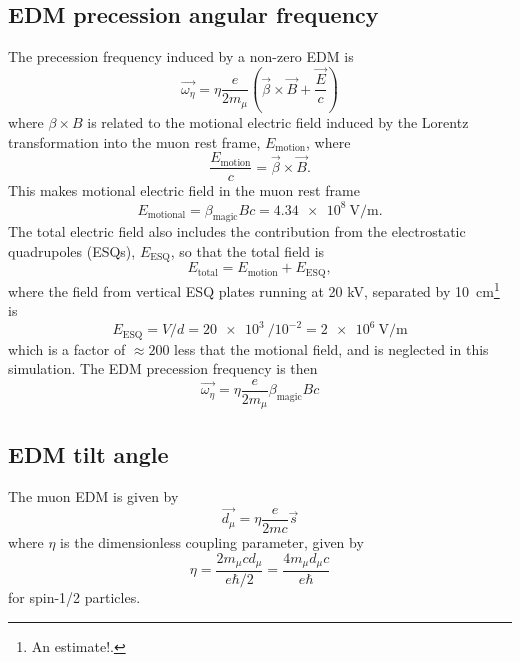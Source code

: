 \documentclass[11pt]{article}
\begin{document}
\subsection{EDM precession angular frequency}
%
The precession frequency induced by a non-zero EDM is 
%
\begin{equation}
\vec{\omega_\eta} = \eta \frac{e}{2 m_\mu}(\vec{\beta} \times \vec{B} + \frac{\vec{E}}{c})
\end{equation}
%
where $\beta \times B$ is related to the motional electric field induced by the Lorentz transformation into the muon rest frame, $E_{\text{motion}}$, where
%
\begin{equation}
\frac{E_{\text{motion}}}{c} = \vec{\beta} \times \vec{B}.
\end{equation}
%
This makes motional electric field in the muon rest frame
%
\begin{equation}
E_{\text{motional}} = \beta_{\text{magic}} B c = \SI{4.34e8}{\volt\per\meter}.
\end{equation}
%
The total electric field also includes the contribution from the electrostatic quadrupoles (ESQs), $E_{\text{ESQ}}$, so that the total field is
%
\begin{equation}
E_{\text{total}} = E_{\text{motion}} + E_{\text{ESQ}},
\end{equation}
%
where the field from vertical ESQ plates running at 20 kV, separated by \SI{10}{\centi\meter}\footnote{An estimate!.} is
%
\begin{equation}
E_{\text{ESQ}} = V / d = \SI{20e3}{} / 10^{-2} = \SI{2e6}{\volt\per\meter}
\end{equation}
%
which is a factor of $\approx 200$ less that the motional field, and is neglected in this simulation.
%
The EDM precession frequency is then
%
\begin{equation}
\vec{\omega_\eta} = \eta \frac{e}{2 m_\mu} \beta_{\text{magic}} B c
\end{equation}

\subsection{EDM tilt angle}

The muon EDM is given by 
\begin{equation}
\vec{d_\mu} = \eta \frac{e}{2 m c} \vec{s}
\end{equation}
%
where $\eta$ is the dimensionless coupling parameter, given by 
% 
\begin{equation}
\eta = \frac{2 m_\mu c d_\mu}{e \hbar/2} = \frac{4 m_\mu  d_\mu c}{e \hbar}
\end{equation}
%
for spin-1/2 particles. 
\end{document}
